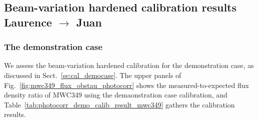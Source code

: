 %
%
%
\subsection{Beam-variation hardened calibration results {\color{blue} Laurence $\rightarrow$ Juan}}

\subsubsection{The demonstration case}

We assess the beam-variation hardened calibration for the
demonstration case, as discussed in Sect.~\ref{se:cal_democase}.
The upper panels of Fig.~\ref{fig:mwc349_flux_obstau_photocorr} shows
the measured-to-expected flux density
ratio of MWC349 using the demaonstration case calibration, and
Table~\ref{tab:photocorr_demo_calib_result_mwc349} gathers the
calibration results. 

